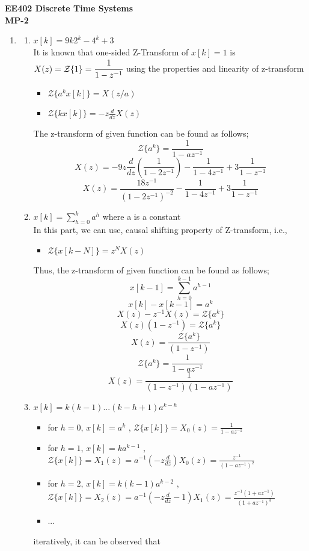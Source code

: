 \documentclass[a4paper,12pt]{article}
\begin{document}
\begin{center}
	\textbf{\large EE402 Discrete Time Systems \\[0.2cm] MP-2} \\
\end{center}


\begin{enumerate}
	\item 
		\begin{enumerate}
			\item 	$x[k]=9k2^k-4^k+3$ \\
			It is known that one-sided Z-Transform of $x[k]=1$ is $X(z)= \mathcal{Z}\{1\}=\cfrac{1}{1-z^{-1}}$
			using the properties and linearity of z-transform
			\begin{itemize}
				\item $	\mathcal{Z}\{a^{k}x[k]\}=X(z/a)$
				\item $	\mathcal{Z}\{kx[k]\}=-z\frac{d}{dz} X(z)	$
			\end{itemize}
			The z-transform of given function can be found as follows;
			$$	\mathcal{Z}\{a^{k}\}=\frac{1}{1-az^{-1}}$$
			$$	X(z)=-9z\frac{d}{dz}(\frac{1}{1-2z^{-1}})-\frac{1}{1-4z^{-1}}+3\frac{1}{1-z^{-1}}	$$
			$$\boxed{	X(z)=\frac{18z^{-1}}{(1-2z^{-1})^{-2}}-\frac{1}{1-4z^{-1}}+3\frac{1}{1-z^{-1}}	}$$
			\item 	$x[k]=\sum_{h=0}^{k}a^h$ where a is a constant\\
			In this part, we can use, causal shifting property of Z-transform, i.e.,
			\begin{itemize}
				\item $	\mathcal{Z}\{x[k-N]\}=z^{N}X(z)$				
			\end{itemize}
			Thus, the z-transform of given function can be found as follows;
			$$x[k-1]=\sum_{h=0}^{k-1}a^{h-1}$$
			$$	x[k]-x[k-1]=a^k $$	
			$$ 	X(z)-z^{-1}X(z)=\mathcal{Z}\{a^{k}\} $$
			$$ 	X(z)(1-z^{-1})=\mathcal{Z}\{a^{k}\} $$	
			$$ 	X(z)=\frac{\mathcal{Z}\{a^{k}\}}{(1-z^{-1})}  $$
			$$	\mathcal{Z}\{a^{k}\}=\frac{1}{1-az^{-1}}$$
			$$\boxed{ X(z)=\frac{1}{(1-z^{-1})(1-az^{-1})} }$$
			
			\newpage
			
			\item 	$ x[k]=k(k-1)...(k-h+1)a^{k-h}$\\
			
			\begin{itemize}
				\item for $h=0$, $x[k]=a^k$ , $\mathcal{Z}\{ x[k] \}= X_0(z)=\frac{1}{1-az^{-1}}$
				\item for $h=1$, $x[k]=ka^{k-1}$ , $\mathcal{Z}\{ x[k] \}= X_1(z)=a^{-1}(-z\frac{d}{dz})X_0(z) =\frac{z^{-1}}{{(1-az^{-1})}^{2}}$
				\item for $h=2$, $x[k]=k(k-1)a^{k-2}$ , $\mathcal{Z}\{ x[k] \}= X_2(z)=a^{-1}(-z\frac{d}{dz}-1)X_1(z)=\frac{z^{-1}(1+az^{-1})}{{(1+az^{-1})}^{3}}$
				\item ...
			\end{itemize}
			iteratively, it can be observed that 
			

\end{enumerate}
\end{enumerate}
\end{document}

